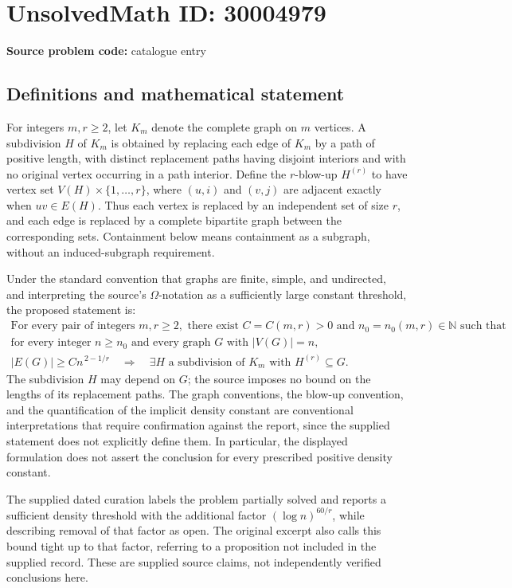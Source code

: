 \documentclass[11pt]{article}
\newcommand{\N}{\mathbb{N}}
\begin{document}
\section*{UnsolvedMath ID: 30004979}
\textbf{Source problem code:} catalogue entry
\subsection{Definitions and mathematical statement}
For integers \(m,r\geq 2\), let \(K_m\) denote the complete graph on \(m\) vertices. A subdivision \(H\) of \(K_m\) is obtained by replacing each edge of \(K_m\) by a path of positive length, with distinct replacement paths having disjoint interiors and with no original vertex occurring in a path interior. Define the \(r\)-blow-up \(H^{(r)}\) to have vertex set \(V(H)\times\{1,\ldots,r\}\), where \((u,i)\) and \((v,j)\) are adjacent exactly when \(uv\in E(H)\). Thus each vertex is replaced by an independent set of size \(r\), and each edge is replaced by a complete bipartite graph between the corresponding sets. Containment below means containment as a subgraph, without an induced-subgraph requirement.

Under the standard convention that graphs are finite, simple, and undirected, and interpreting the source's \(\Omega\)-notation as a sufficiently large constant threshold, the proposed statement is:
\[
\begin{gathered}
\text{For every pair of integers }m,r\geq 2,\text{ there exist }C=C(m,r)>0
\text{ and }n_0=n_0(m,r)\in\N\text{ such that}\\
\text{for every integer }n\geq n_0\text{ and every graph }G\text{ with }|V(G)|=n,\\
|E(G)|\geq C n^{\,2-1/r}
\quad\Longrightarrow\quad
\exists H\text{ a subdivision of }K_m\text{ with }H^{(r)}\subseteq G.
\end{gathered}
\]
The subdivision \(H\) may depend on \(G\); the source imposes no bound on the lengths of its replacement paths. The graph conventions, the blow-up convention, and the quantification of the implicit density constant are conventional interpretations that require confirmation against the report, since the supplied statement does not explicitly define them. In particular, the displayed formulation does not assert the conclusion for every prescribed positive density constant.

The supplied dated curation labels the problem partially solved and reports a sufficient density threshold with the additional factor \((\log n)^{60/r}\), while describing removal of that factor as open. The original excerpt also calls this bound tight up to that factor, referring to a proposition not included in the supplied record. These are supplied source claims, not independently verified conclusions here.
\end{document}
